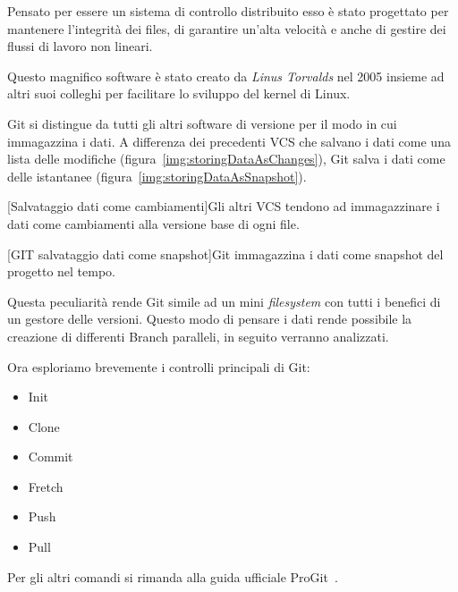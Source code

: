 			Pensato per essere un sistema di controllo distribuito esso è stato progettato per mantenere l'integrità dei files, di garantire un'alta velocità e anche di gestire dei flussi di lavoro non lineari.
			
			Questo magnifico software è stato creato da \textit{Linus Torvalds} nel 2005 insieme ad altri suoi colleghi per facilitare lo sviluppo del kernel di Linux.
			
			Git si distingue da tutti gli altri software di versione per il modo in cui immagazzina i dati. A differenza dei precedenti VCS che salvano i dati come una lista delle modifiche (figura~\ref{img:storingDataAsChanges}), Git salva i dati come delle istantanee (figura~\ref{img:storingDataAsSnapshot}). 
			
			\begin{center}
				[Salvataggio dati come cambiamenti]{Gli altri VCS tendono ad immagazzinare i dati come cambiamenti alla versione base di ogni file.}
				\label{img:storingDataAsChanges}
			\end{center}
		
			\begin{center}
				[GIT salvataggio dati come snapshot]{Git immagazzina i dati come snapshot del progetto nel tempo.}\label{img:storingDataAsSnapshot}
			\end{center}
			
			Questa peculiarità rende Git simile ad un mini \textit{filesystem} con tutti i benefici di un gestore delle versioni.
			Questo modo di pensare i dati rende possibile la creazione di differenti Branch paralleli, in seguito verranno analizzati.
			
			Ora esploriamo brevemente i controlli principali di Git:
			
			\begin{itemize}
				\item Init
				\item Clone
				\item Commit
				\item Fretch
				\item Push
				\item Pull
			\end{itemize}
			Per gli altri comandi si rimanda alla guida ufficiale ProGit~\citep{ProGit2018}.
			
